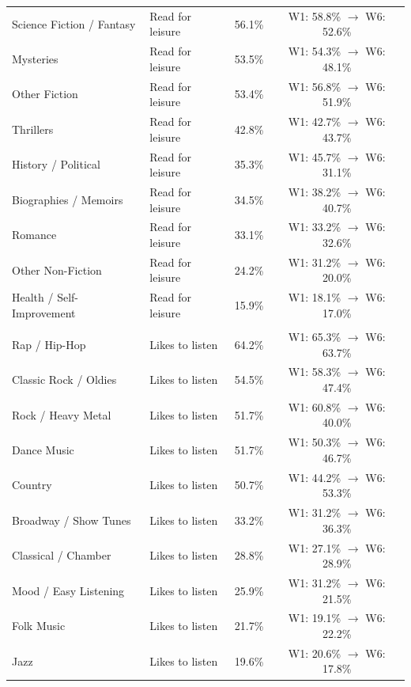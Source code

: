 \documentclass[12pt]{article}
\begin{document}
\begin{table}[htbp]
\begin{tabular*}{\linewidth}{@{\extracolsep{\fill}}llcc@{}}
\quad Science Fiction / Fantasy & Read for leisure & 56.1\% & W1: 58.8\% $\rightarrow$ W6: 52.6\% \\
\quad Mysteries & Read for leisure & 53.5\% & W1: 54.3\% $\rightarrow$ W6: 48.1\% \\
\quad Other Fiction & Read for leisure & 53.4\% & W1: 56.8\% $\rightarrow$ W6: 51.9\% \\
\quad Thrillers & Read for leisure & 42.8\% & W1: 42.7\% $\rightarrow$ W6: 43.7\% \\
\quad History / Political & Read for leisure & 35.3\% & W1: 45.7\% $\rightarrow$ W6: 31.1\% \\
\quad Biographies / Memoirs & Read for leisure & 34.5\% & W1: 38.2\% $\rightarrow$ W6: 40.7\% \\
\quad Romance & Read for leisure & 33.1\% & W1: 33.2\% $\rightarrow$ W6: 32.6\% \\
\quad Other Non-Fiction & Read for leisure & 24.2\% & W1: 31.2\% $\rightarrow$ W6: 20.0\% \\
\quad Health / Self-Improvement & Read for leisure & 15.9\% & W1: 18.1\% $\rightarrow$ W6: 17.0\% \\
\addlinespace[3pt]
\multicolumn{4}{l}{\textbf{Panel C: Musical Genre Preferences (Waves 1--6, $N = 201$, $1,006$ Obs)}} \\
\quad Rap / Hip-Hop & Likes to listen & 64.2\% & W1: 65.3\% $\rightarrow$ W6: 63.7\% \\
\quad Classic Rock / Oldies & Likes to listen & 54.5\% & W1: 58.3\% $\rightarrow$ W6: 47.4\% \\
\quad Rock / Heavy Metal & Likes to listen & 51.7\% & W1: 60.8\% $\rightarrow$ W6: 40.0\% \\
\quad Dance Music & Likes to listen & 51.7\% & W1: 50.3\% $\rightarrow$ W6: 46.7\% \\
\quad Country & Likes to listen & 50.7\% & W1: 44.2\% $\rightarrow$ W6: 53.3\% \\
\quad Broadway / Show Tunes & Likes to listen & 33.2\% & W1: 31.2\% $\rightarrow$ W6: 36.3\% \\
\quad Classical / Chamber & Likes to listen & 28.8\% & W1: 27.1\% $\rightarrow$ W6: 28.9\% \\
\quad Mood / Easy Listening & Likes to listen & 25.9\% & W1: 31.2\% $\rightarrow$ W6: 21.5\% \\
\quad Folk Music & Likes to listen & 21.7\% & W1: 19.1\% $\rightarrow$ W6: 22.2\% \\
\quad Jazz & Likes to listen & 19.6\% & W1: 20.6\% $\rightarrow$ W6: 17.8\% \\

\end{tabular*}
\end{table}
\end{document}
